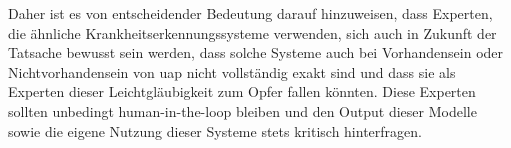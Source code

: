 Daher ist es von entscheidender Bedeutung darauf hinzuweisen, dass Experten, die ähnliche Krankheitserkennungssysteme verwenden, sich auch in Zukunft der Tatsache bewusst sein werden, dass solche Systeme auch bei Vorhandensein oder Nichtvorhandensein von \acrlong{uap} nicht vollständig exakt sind und dass sie als Experten dieser Leichtgläubigkeit zum Opfer fallen könnten. Diese Experten sollten unbedingt \gls{human-in-the-loop} bleiben und den Output dieser Modelle sowie die eigene Nutzung dieser Systeme stets kritisch hinterfragen.